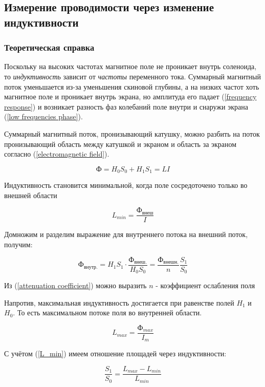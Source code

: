 \documentclass[a4paper, 12pt]{article} %
\begin{document}
	\subsection{Измерение проводимости через изменение индуктивности}
    \subsubsection{Теоретическая справка}
    
    Поскольку на высоких частотах магнитное поле не проникает внутрь соленоида, то \textit{индуктивность} зависит от \textit{частоты} переменного тока. Суммарный магнитный поток уменьшается из-за уменьшения скиновой глубины, а на низких частот хоть магнитное поле и проникает внутрь экрана, но амплитуда его падает (\ref{frequency response}) и возникает разность фаз колебаний поле внутри и снаружи экрана (\ref{low frequencies phase}). 

    Суммарный магнитный поток, пронизывающий катушку, можно разбить на поток пронизывающий область между катушкой и экраном и область за экраном согласно (\ref{electromagnetic field}).

    \[ \text{Ф} = H_0 S_0 + H_1 S_1 = L I\]

    Индуктивность становится минимальной, когда поле сосредоточено только во внешней области 
    
    \begin{equation}
        L_{min} = \frac{\text{Ф}_\text{внеш}}{I}
        \label{L_min}
    \end{equation}

    Домножим и разделим выражение для внутреннего потока на внешний поток, получим:

    \[\text{Ф}_\text{внутр.} = H_1 S_1 \cdot \frac{\text{Ф}_\text{внеш.}}{H_0 S_0} = \frac{\text{Ф}_\text{внешн.}}{n} \frac{S_1}{S_0}\]

    Из (\ref{attenuation coefficient}) можно выразить $n$ - коэффициент ослабления поля

    Напротив, максимальная индуктивность достигается при равенстве полей $H_1$ и $H_0$. То есть максимальном потоке поля во внутренней области.

    \[ L_{max} = \frac{\text{Ф}_{max}}{I_m}\]

     С учётом (\ref{L_min}) имеем отношение площадей через индуктивности:

     \begin{equation}
         \frac{S_1}{S_0} = \frac{L_{max} - L_{min}}{L_{min}}
     \end{equation}
\end{document}
